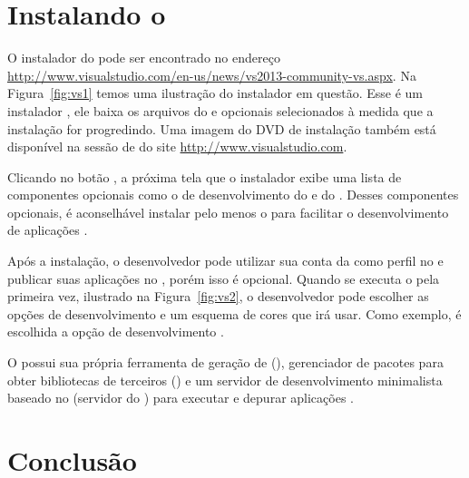 
\section{Instalando o } 

O instalador do  pode ser encontrado no endereço \url{http://www.visualstudio.com/en-us/news/vs2013-community-vs.aspx}. Na Figura~\ref{fig:vs1} temos uma ilustração do instalador em questão. Esse é um instalador , ele baixa os arquivos do  e opcionais selecionados à medida que a instalação for progredindo. Uma imagem do DVD de instalação  também está disponível na sessão de  do site \url{http://www.visualstudio.com}.


Clicando no botão , a próxima tela que o instalador exibe uma lista de componentes opcionais como o  de desenvolvimento do  e do . Desses componentes opcionais, é aconselhável instalar pelo menos o  para facilitar o desenvolvimento de aplicações .

Após a instalação, o desenvolvedor pode utilizar sua conta da  como perfil no  e publicar suas aplicações no , porém isso é opcional. Quando se executa o  pela primeira vez, ilustrado na Figura~\ref{fig:vs2}, o desenvolvedor pode escolher as opções de desenvolvimento e um esquema de cores que irá usar. Como exemplo, é escolhida a opção de desenvolvimento .


O  possui sua própria ferramenta de geração de  (), gerenciador de pacotes para obter bibliotecas de terceiros () e um servidor de desenvolvimento minimalista baseado no  (servidor  do ) para executar e depurar aplicações .  

\section{Conclusão}

